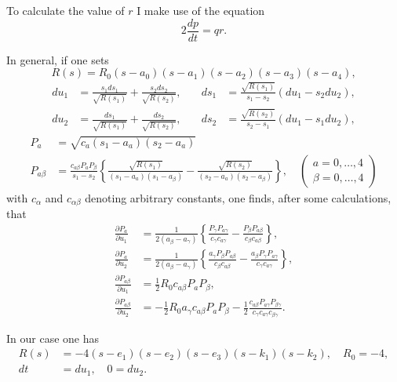 \documentclass{article}
\begin{document}
To calculate the value of $r$ I make use of the equation
\[
2\frac{dp}{dt} = qr.
\]

In general, if one sets
\[
R(s) = R_0(s - a_0)(s - a_1)(s - a_2)(s - a_3)(s - a_4),
\]
\begin{align*}
du_1 &= \frac{s_1ds_1}{\sqrt{R(s_1)}} + \frac{s_2ds_2}{\sqrt{R(s_2)}}, \quad &ds_1 &= \frac{\sqrt{R(s_1)}}{s_1 - s_2}(du_1 - s_2du_2), \\
du_2 &= \frac{ds_1}{\sqrt{R(s_1)}} + \frac{ds_2}{\sqrt{R(s_2)}}, \quad &ds_2 &= \frac{\sqrt{R(s_2)}}{s_2 - s_1}(du_1 - s_1du_2),
\end{align*}
\begin{align*}
P_a &= \sqrt{c_a(s_1 - a_a)(s_2 - a_a)} \\
P_{a\beta} &= \frac{c_{a\beta}P_aP_\beta}{s_1 - s_2}\left\{\frac{\sqrt{R(s_1)}}{(s_1 - a_a)(s_1 - a_\beta)} - \frac{\sqrt{R(s_2)}}{(s_2 - a_a)(s_2 - a_\beta)}\right\}, \quad \begin{pmatrix} a = 0, \ldots, 4 \\ \beta = 0, \ldots, 4 \end{pmatrix}
\end{align*}
with $c_\alpha$ and $c_{\alpha\beta}$ denoting arbitrary constants, one finds, after some calculations, that
\begin{align*}
\frac{\partial P_a}{\partial u_1} &= \frac{1}{2(a_\beta - a_\gamma)}\left\{\frac{P_\gamma P_{a\gamma}}{c_\gamma c_{a\gamma}} - \frac{P_\beta P_{a\beta}}{c_\beta c_{a\beta}}\right\}, \\
\frac{\partial P_a}{\partial u_2} &= \frac{1}{2(a_\beta - a_\gamma)}\left\{\frac{a_\gamma P_\beta P_{a\beta}}{c_\beta c_{a\beta}} - \frac{a_\beta P_\gamma P_{a\gamma}}{c_\gamma c_{a\gamma}}\right\}, \\
\frac{\partial P_{a\beta}}{\partial u_1} &= \frac{1}{2}R_0 c_{a\beta} P_a P_\beta, \\
\frac{\partial P_{a\beta}}{\partial u_2} &= -\frac{1}{2}R_0 a_\gamma c_{a\beta} P_a P_\beta - \frac{1}{2}\frac{c_{a\beta}P_{a\gamma}P_{\beta\gamma}}{c_\gamma c_{a\gamma}c_{\beta\gamma}}.
\end{align*}

In our case one has
\begin{align*}
R(s) &= -4(s - e_1)(s - e_2)(s - e_3)(s - k_1)(s - k_2), \quad R_0 = -4, \\
dt &= du_1, \quad 0 = du_2.
\end{align*}
\end{document}
